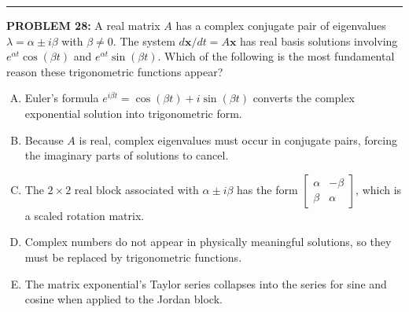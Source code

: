\documentclass[12pt]{amsart}
\newcommand{\divider}{
  \vspace{-1em} %
  \noindent
  \raisebox{-0.15ex}{\textbullet}%
  \hspace{0.5em}%
  \rule[0.5ex]{0.95\textwidth}{1.0pt}%
  \hspace{0.5em}%
  \raisebox{-0.15ex}{\textbullet}%
  \vspace{0em} %
}
\begin{document}
\divider

{\bf PROBLEM 28:}
%
A real matrix $A$ has a complex conjugate pair of eigenvalues $\lambda = \alpha \pm i\beta$ with $\beta \neq 0$. The system $d\mathbf{x}/dt = A\mathbf{x}$ has real basis solutions involving $e^{\alpha t} \cos(\beta t)$ and $e^{\alpha t} \sin(\beta t)$. Which of the following is the most fundamental reason these trigonometric functions appear?

\begin{enumerate}[(A)]
\item Euler's formula $e^{i\beta t} = \cos(\beta t) + i\sin(\beta t)$ converts the complex exponential solution into trigonometric form.
\item Because $A$ is real, complex eigenvalues must occur in conjugate pairs, forcing the imaginary parts of solutions to cancel.
\item The $2 \times 2$ real block associated with $\alpha \pm i\beta$ has the form $\begin{bmatrix} \alpha & -\beta \\ \beta & \alpha \end{bmatrix}$, which is a scaled rotation matrix.
\item Complex numbers do not appear in physically meaningful solutions, so they must be replaced by trigonometric functions.
\item The matrix exponential's Taylor series collapses into the series for sine and cosine when applied to the Jordan block.
\end{enumerate}
\end{document}
